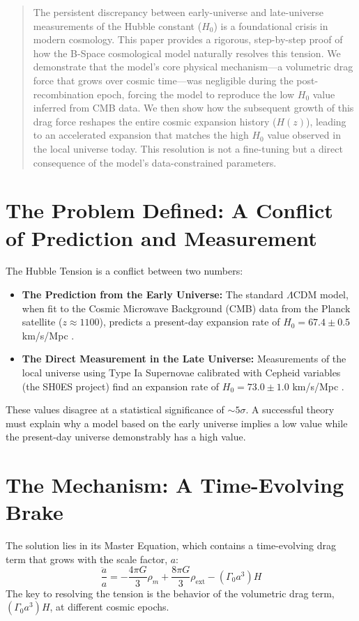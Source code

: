 \documentclass{BSpacePaper} %
\begin{document}
\makeBSCSsupplementtitle

\begin{abstract}
\noindent
The persistent discrepancy between early-universe and late-universe measurements of the Hubble constant ($H_0$) is a foundational crisis in modern cosmology. This paper provides a rigorous, step-by-step proof of how the B-Space cosmological model naturally resolves this tension. We demonstrate that the model's core physical mechanism—a volumetric drag force that grows over cosmic time—was negligible during the post-recombination epoch, forcing the model to reproduce the low $H_0$ value inferred from CMB data. We then show how the subsequent growth of this drag force reshapes the entire cosmic expansion history ($H(z)$), leading to an accelerated expansion that matches the high $H_0$ value observed in the local universe today. This resolution is not a fine-tuning but a direct consequence of the model's data-constrained parameters.
\end{abstract}

\section{The Problem Defined: A Conflict of Prediction and Measurement}
The Hubble Tension is a conflict between two numbers:
\begin{itemize}
    \item \textbf{The Prediction from the Early Universe:} The standard \(\Lambda\)CDM model, when fit to the Cosmic Microwave Background (CMB) data from the Planck satellite ($z \approx 1100$), predicts a present-day expansion rate of \textbf{$H_0 = 67.4 \pm 0.5$} km/s/Mpc \citep{Planck2020}.
    \item \textbf{The Direct Measurement in the Late Universe:} Measurements of the local universe using Type Ia Supernovae calibrated with Cepheid variables (the SH0ES project) find an expansion rate of \textbf{$H_0 = 73.0 \pm 1.0$} km/s/Mpc \citep{Riess2022}.
\end{itemize}
These values disagree at a statistical significance of $\sim 5\sigma$. A successful theory must explain why a model based on the early universe implies a low value while the present-day universe demonstrably has a high value.

\section{The \bspace{} Mechanism: A Time-Evolving Brake}
The \bspace{} solution lies in its Master Equation, which contains a time-evolving drag term that grows with the scale factor, $a$:
\begin{equation}
    \frac{\ddot{a}}{a} = -\frac{4\pi G}{3}\rho_m + \frac{8\pi G}{3}\rho_{\text{ext}} - \left(\Gamma_0 a^3\right) H
\end{equation}
The key to resolving the tension is the behavior of the volumetric drag term, $(\Gamma_0 a^3)H$, at different cosmic epochs.
\end{document}
